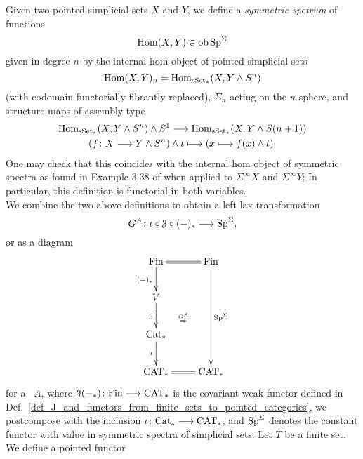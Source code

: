     \begin{defn}\label{def_left_lax_transform_G^A}
      Given two pointed simplicial sets $X$ and $Y$, we define a \emph{symmetric
      spetrum} of functions 
      \begin{displaymath}
        \operatorname{Hom}(X,Y) \in \operatorname{ob} \mathrm{Sp}^\Sigma
      \end{displaymath}
      given in degree $n$ by the internal hom-object of pointed simplicial sets
      \begin{displaymath}
        \operatorname{Hom}(X,Y)_n = \operatorname{Hom}_{\mathrm{sSet}_*}(X,Y \wedge S^n)
      \end{displaymath}
      (with codomain functorially fibrantly replaced), $\Sigma_n$ acting on the
      $n$-sphere, and structure maps of assembly type
      \begin{gather*}
      \operatorname{Hom}_{\mathrm{sSet}_*}(X,Y \wedge S^n) \wedge S^1 \longrightarrow \operatorname{Hom}_{\mathrm{sSet}_*}(X,Y \wedge S(n+1))\\
      (f \colon X \longrightarrow Y \wedge S^n) \wedge t \longmapsto (x \longmapsto f(x) \wedge t).
      \end{gather*}
      One may check that this coincides with the internal hom object of
      symmetric spectra as found in Example 3.38 of \cite{schwede2012symmetric}
      when applied to $\Sigma^\infty X$ and $\Sigma^\infty Y$; In particular,
      this definition is functorial in both variables.\\
      We combine the two above definitions to obtain a left lax transformation
      \begin{displaymath}
        G^A \colon \iota \circ \mathcal{J} \circ (-)_* \longrightarrow \mathrm{Sp}^\Sigma,
      \end{displaymath}
      or as a diagram
      \begin{displaymath}
        \xymatrix{
          \Fin \ar@{=}[r] \ar[d]_{(-)_*} \ar@{}[rddd]|{\overset{G^A}{\Rightarrow}} & \Fin \ar[ddd]^{\Sp^{\Sigma}} \\
          V \ar[d]_{\cJ} & \\
          \Cat_* \ar[d]_{\iota} & \\
          \CAT_* \ar@{=}[r] & \CAT_*
        }
      \end{displaymath}
      for a \hring~$A$, where $\mathcal{J}(-_*) \colon \mathrm{Fin} \longrightarrow \mathrm{CAT}_*$ is the covariant
      weak functor defined in
      Def.~\ref{def_J_and_functors_from_finite_sets_to_pointed_categories}, we
      postcompose with the inclusion $\iota \colon \mathrm{Cat}_* \longrightarrow \mathrm{CAT}_*$, and
      $\mathrm{Sp}^\Sigma$ denotes the constant functor with value in symmetric spectra of
      simplicial sets: Let $T$ be a finite set. We define a pointed functor

\end{defn}
